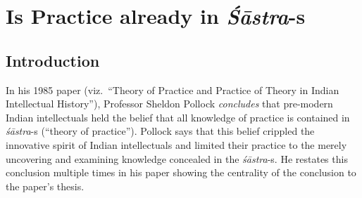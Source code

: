 \chapter{Is Practice already in {{\sl\bfseries Śāstra}\relax}-s}\label{chapter\thechapter:begin}
\vskip -10pt


\vskip -10pt


\section*{Introduction}

In his 1985 paper (viz.\ ``Theory of Practice and Practice of Theory in Indian Intellectual History''), Professor Sheldon Pollock {\sl concludes} that pre-modern Indian intellectuals held the belief that all knowledge of practice is contained in {\sl śāstra}-s (``theory  of practice'').  Pollock says that this belief crippled the innovative spirit of Indian intellectuals and limited their practice to the merely uncovering and examining knowledge concealed in the {\sl śāstra}-s. He restates this conclusion multiple times in his paper showing the centrality of the conclusion to the paper's thesis. 

